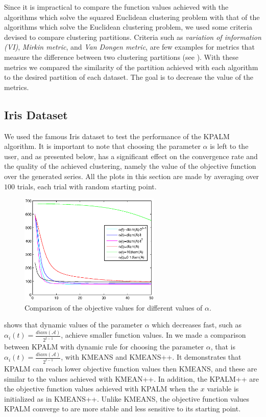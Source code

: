 \documentclass[12pt]{article}
\numberwithin{equation}{section}
\begin{document}
Since it is impractical to compare the function values achieved with the algorithms which solve the squared Euclidean clustering problem with that of the algorithms which solve the Euclidean clustering problem, we used some criteria devised to compare clustering partitions. Criteria such as \textit{variation of information (VI)}, \textit{Mirkin metric}, and \textit{Van Dongen metric}, are few examples for metrics that measure the difference between two clustering partitions (see \cite{M2005}). With these metrics we compared the similarity of the partition achieved with each algorithm to the desired partition of each dataset. The goal is to decrease the value of the metrics.

\subsection{Iris Dataset}
We used the famous Iris dataset to test the performance of the KPALM algorithm. It is important to note that choosing the parameter $\alpha$ is left to the user, and as presented below, has a significant effect on the convergence rate and the quality of the achieved clustering, namely the value of the objective function over the generated series. All the plots in this section are made by averaging over $100$ trials, each trial with random starting point.

\begin{figure}[h]
    \centering
    \includegraphics[width=0.6\textwidth]{dynamic_alpha_kpalm}
    \caption{Comparison of the objective values for different values of $\alpha$.}
    \label{fig:dynamic_alpha_psi_comp}
\end{figure} 

 shows that dynamic values of the parameter $\alpha$ which decreases fast, such as $\alpha_i(t)=
\frac{diam(\mathcal{A})}{2^{t-1}}$, achieve smaller function values.
In  we made a comparison between KPALM with dynamic rule for choosing the parameter $\alpha$, that is $\alpha_i(t)=\frac{diam(\mathcal{A})}{2^{t-1}}$, with KMEANS and KMEANS++. It demonstrates that KPALM can reach lower objective function values then KMEANS, and these are similar to the values achieved with KMEAN++. In addition, the KPALM++ are the objective function values achieved with KPALM when the $x$ variable is initialized as in KMEANS++. Unlike KMEANS, the objective function values KPALM converge to are more stable and less sensitive to its starting point.
\end{document}
